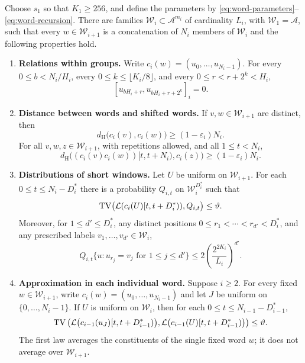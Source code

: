 \begin{proposition}\label{prop:words}
Choose $s_1$ so that $K_1\ge256$, and define the parameters by
\eqref{eq:word-parameters}--\eqref{eq:word-recursion}.
There are families $\mathcal W_i\subset\mathcal A^{m_i}$ of cardinality
$L_i$, with $\mathcal W_1=\mathcal A$, such that every
$w\in\mathcal W_{i+1}$ is a concatenation of $N_i$ members of
$\mathcal W_i$ and the following properties hold.
\begin{enumerate}[label=\textup{(W\arabic*)},ref=W\arabic*,leftmargin=*]
\item\label{word:graph}\textbf{Relations within groups.}
Write $c_i(w)=(u_0,\ldots,u_{N_i-1})$.
For every $0\le b<N_i/H_i$, every
$0\le k\le\lfloor K_i/8\rfloor$, and every
$0\le r<r+2^k<H_i$,
\[
  [u_{bH_i+r},u_{bH_i+r+2^k}]_i=0.
\]
\item\label{word:distance}\textbf{Distance between words and shifted words.}
If $v,w\in\mathcal W_{i+1}$ are distinct, then
\[
  d_{\mathrm H}\bigl(c_i(v),c_i(w)\bigr)
     \ge(1-\varepsilon_i)N_i.
\]
For all $v,w,z\in\mathcal W_{i+1}$, with repetitions allowed, and all
$1\le t<N_i$,
\[
  d_{\mathrm H}\bigl((c_i(v)c_i(w))[t,t+N_i),c_i(z)\bigr)
     \ge(1-\varepsilon_i)N_i.
\]
\item\label{word:window}\textbf{Distributions of short windows.}
Let $U$ be uniform on $\mathcal W_{i+1}$.
For each $0\le t\le N_i-D_i^*$ there is a probability $Q_{i,t}$ on
$\mathcal W_i^{D_i^*}$ such that
\[
  \operatorname{TV}\bigl(\mathcal L(c_i(U)[t,t+D_i^*)),Q_{i,t}\bigr)
     \le\vartheta.
\]
Moreover, for $1\le d'\le D_i^*$, any distinct positions
$0\le r_1<\cdots<r_{d'}<D_i^*$, and any prescribed labels
$v_1,\ldots,v_{d'}\in\mathcal W_i$,
\begin{equation}\label{eq:word-sublist}
  Q_{i,t}\{u:u_{r_j}=v_j\text{ for }1\le j\le d'\}
       \le 2\left(\frac{2^{2K_i}}{L_i}\right)^{d'}.
\end{equation}
\item\label{word:frequency}\textbf{Approximation in each individual word.}
Suppose $i\ge2$.  For every fixed $w\in\mathcal W_{i+1}$, write
$c_i(w)=(u_0,\ldots,u_{N_i-1})$ and let $J$ be uniform on
$\{0,\ldots,N_i-1\}$.  If $U$ is uniform on $\mathcal W_i$, then for
each $0\le t\le N_{i-1}-D_{i-1}^*$,
\[
 \operatorname{TV}\left(
   \mathcal L\bigl(c_{i-1}(u_J)[t,t+D_{i-1}^*)\bigr),
   \mathcal L\bigl(c_{i-1}(U)[t,t+D_{i-1}^*)\bigr)
 \right)\le\vartheta.
\]
The first law averages the constituents of the single fixed word $w$;
it does not average over $\mathcal W_{i+1}$.
\end{enumerate}
\end{proposition}

